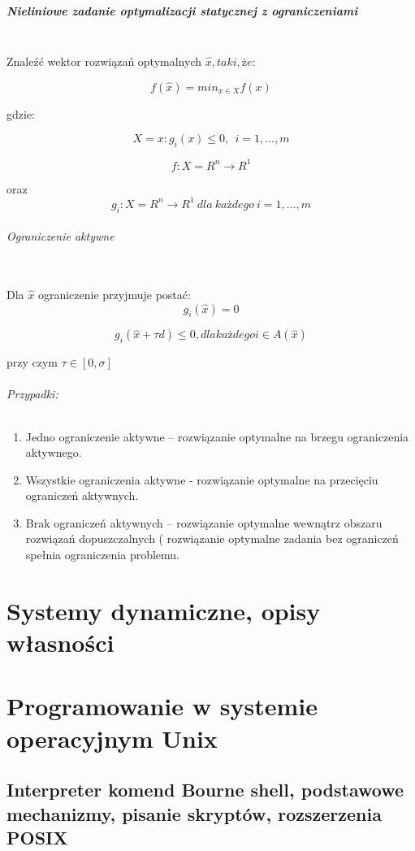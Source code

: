 \documentclass[a4paper,twoside]{report}
\begin{document}
\paragraph{Nieliniowe zadanie optymalizacji statycznej z ograniczeniami\\\\}
Znaleźć wektor rozwiązań optymalnych $\hat{x}, taki, że:$

$$f(\hat{x})=min_{x \in X}f(x)$$

gdzie:

$$X={x:g_i(x) \le 0,~~i=1,...,m}$$

$$f:X = R^n \longrightarrow R^1$$

oraz $$g_i:X = R^n \longrightarrow R^1~dla~każdego~i=1,...,m$$

\subparagraph{Ograniczenie aktywne\\\\}

Dla $\hat{x}$ ograniczenie przyjmuje postać:
\[  g_i(\hat{x})=0 \]


$$ g_i(\hat{x}+\tau d) \le 0, dla każdego i \in A(\hat{x})$$

przy czym $\tau \in [0,\sigma]$



\subparagraph{Przypadki:}

\begin{enumerate}

\item Jedno ograniczenie aktywne – rozwiązanie optymalne na brzegu ograniczenia
aktywnego.
\item Wszystkie ograniczenia aktywne - rozwiązanie optymalne na przecięciu ograniczeń
aktywnych.
\item Brak ograniczeń aktywnych – rozwiązanie optymalne wewnątrz obszaru rozwiązań
dopuszczalnych ( rozwiązanie optymalne zadania bez ograniczeń spełnia
ograniczenia problemu.

\end{enumerate}

\chapter{Systemy dynamiczne, opisy własności}


\chapter{Programowanie w systemie operacyjnym Unix}
\section{Interpreter komend Bourne shell, podstawowe mechanizmy, pisanie skryptów, rozszerzenia POSIX }
\end{document}
